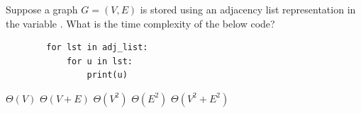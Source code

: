 \begin{prob}
    Suppose a graph $G = (V, E)$ is stored using an adjacency list representation in
    the variable .
    What is the time complexity of the below code?

    \begin{verbatim}
        for lst in adj_list:
            for u in lst:
                print(u)
    \end{verbatim}

    \begin{choices}
        \choice $\Theta(V)$
        \correctchoice $\Theta(V + E)$
        \choice $\Theta(V^2)$
        \choice $\Theta(E^2)$
        \choice $\Theta(V^2 + E^2)$
    \end{choices}

\end{prob}
